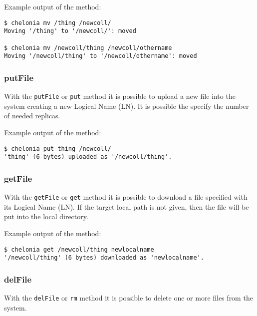 Example output of the method:
\begin{verbatim}
$ chelonia mv /thing /newcoll/
Moving '/thing' to '/newcoll/': moved 

$ chelonia mv /newcoll/thing /newcoll/othername
Moving '/newcoll/thing' to '/newcoll/othername': moved   
\end{verbatim}

\subsubsection{putFile} %
\label{ssub:putfile}
With the \texttt{putFile} or \texttt{put} method it is possible to upload a new file into the system creating a new Logical Name (LN). It is possible the specify the number of needed replicas.
\hspace*{0.5cm}
\begin{shaded}
\end{shaded}

Example output of the method:
\begin{verbatim}
$ chelonia put thing /newcoll/
'thing' (6 bytes) uploaded as '/newcoll/thing'.    
\end{verbatim}

\subsubsection{getFile} %
\label{ssub:getfile}
With the \texttt{getFile} or \texttt{get} method it is possible to download a file specified with its Logical Name (LN). If the target local path is not given, then the file will be put into the local directory.
\hspace*{0.5cm}
\begin{shaded}
\end{shaded}

Example output of the method:
\begin{verbatim}
$ chelonia get /newcoll/thing newlocalname
'/newcoll/thing' (6 bytes) downloaded as 'newlocalname'.
\end{verbatim}

\subsubsection{delFile} %
\label{ssub:delfile}
With the \texttt{delFile} or \texttt{rm} method it is possible to delete one or more files from the system.
\hspace*{0.5cm}
\begin{shaded}
\end{shaded}

